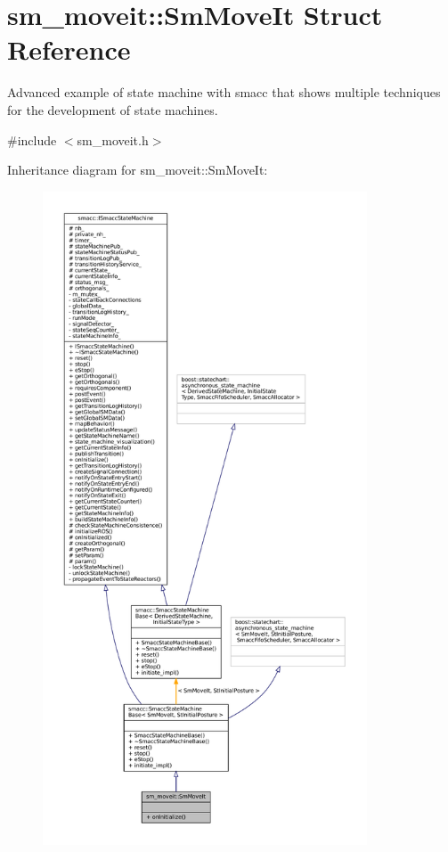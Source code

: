 \hypertarget{structsm__moveit_1_1SmMoveIt}{}\section{sm\+\_\+moveit\+:\+:Sm\+Move\+It Struct Reference}
\label{structsm__moveit_1_1SmMoveIt}


Advanced example of state machine with smacc that shows multiple techniques for the development of state machines.  




{\ttfamily \#include $<$sm\+\_\+moveit.\+h$>$}



Inheritance diagram for sm\+\_\+moveit\+:\+:Sm\+Move\+It\+:
\nopagebreak
\begin{figure}[H]
\begin{center}
\leavevmode
\includegraphics[height=550pt]{structsm__moveit_1_1SmMoveIt__inherit__graph}
\end{center}
\end{figure}


